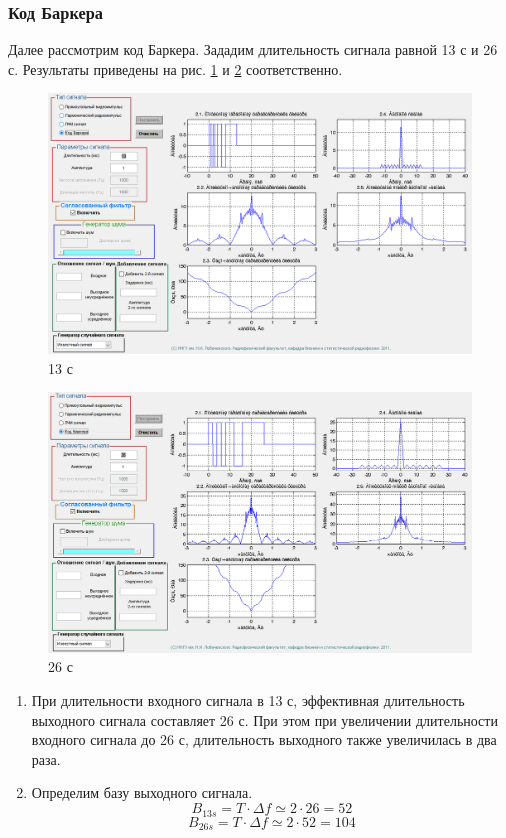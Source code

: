 \subsubsection{Код Баркера}
Далее рассмотрим код Баркера. Зададим длительность сигнала равной 13 с и 26 с.
Результаты приведены на рис. \ref{fig:task_2_4_13} и \ref{fig:task_2_4_26} соответственно.
\begin{figure}[H]
    \centering
    \includegraphics[width=0.9\linewidth]{imgs/task_2/t2s4_13.png}
    \caption{13 с}
    \label{fig:task_2_4_13}
\end{figure}
\begin{figure}[H]
    \centering
    \includegraphics[width=0.9\linewidth]{imgs/task_2/t2s4_26.png}
    \caption{26 с}
    \label{fig:task_2_4_26}
\end{figure}

\begin{enumerate}
    \item При длительности входного сигнала в 13 с, эффективная длительность выходного сигнала составляет
    26 с. При этом при увеличении длительности входного сигнала до 26 с, длительность выходного также увеличилась в два раза.
    \item Определим базу выходного сигнала. 
    \begin{equation}
        B_{13 s} = T \cdot \Delta f \simeq 2 \cdot 26 = 52
    \end{equation}
    \begin{equation}
        B_{26 s} = T \cdot \Delta f \simeq 2 \cdot 52 = 104
    \end{equation}

\end{enumerate}